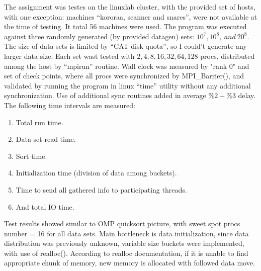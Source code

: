 \documentclass{article}
\begin{document}
The assignment was testes on the linuxlab cluster, with the provided set of hosts, with one
exception: machines ``kororaa, scanner and snares'', were not available at the time of
testing. It total 56 machines were used. The program was executed against three randomly
generated (by provided datagen) sets: $10^7,
10^8,\ and \  20^8$. The size of data sets is limited by ``CAT disk quota'', so I could't
generate any larger data size. Each set wast tested with $2,4,8,16,32,64,128$ procs,
distributed among the host by ``mpirun'' routine.
Wall clock was measured by "rank 0" and set of check points, where all procs were
synchronized by MPI\_Barrier(), and validated by running the program in linux ``time''
utility without any additional synchronization. Use of additional sync routines added in average $\%2 -
\%3$  delay.
\\

The following time intervals are measured:
\begin{enumerate}[1.]
\item Total run time.
\item Data set read time.
\item Sort time.
\item Initialization time (division of data among buckets).
\item Time to send all gathered info to participating threads.
\item And total IO time.
\end{enumerate}
Test results showed similar to OMP quicksort picture, with sweet spot procs number = 16 for
all data sets. Main bottleneck is data initialization, since data distribution was previously
unknown, variable size buckets were implemented, with use of realloc(). According to realloc
documentation, if it is unable to find appropriate chunk of memory, new memory is allocated
with followed data move. 

\pagebreak

\end{document}
